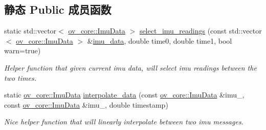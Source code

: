 \subsection*{静态 Public 成员函数}
\begin{DoxyCompactItemize}
\item 
static std\+::vector$<$ \hyperlink{structov__core_1_1ImuData}{ov\+\_\+core\+::\+Imu\+Data} $>$ \hyperlink{classov__msckf_1_1Propagator_a2f2d18be72bfc40bab5ae5eab2bae10e}{select\+\_\+imu\+\_\+readings} (const std\+::vector$<$ \hyperlink{structov__core_1_1ImuData}{ov\+\_\+core\+::\+Imu\+Data} $>$ \&\hyperlink{classov__msckf_1_1Propagator_aa1639a14dc1149d2e47be177bf33b572}{imu\+\_\+data}, double time0, double time1, bool warn=true)
\begin{DoxyCompactList}\small\item\em Helper function that given current imu data, will select imu readings between the two times. \end{DoxyCompactList}\item 
static \hyperlink{structov__core_1_1ImuData}{ov\+\_\+core\+::\+Imu\+Data} \hyperlink{classov__msckf_1_1Propagator_a3dde6d888eec85594aa6a864d141d5dc}{interpolate\+\_\+data} (const \hyperlink{structov__core_1_1ImuData}{ov\+\_\+core\+::\+Imu\+Data} \&imu\+\_, const \hyperlink{structov__core_1_1ImuData}{ov\+\_\+core\+::\+Imu\+Data} \&imu\+\_, double timestamp)
\begin{DoxyCompactList}\small\item\em Nice helper function that will linearly interpolate between two imu messages. \end{DoxyCompactList}\end{DoxyCompactItemize}
